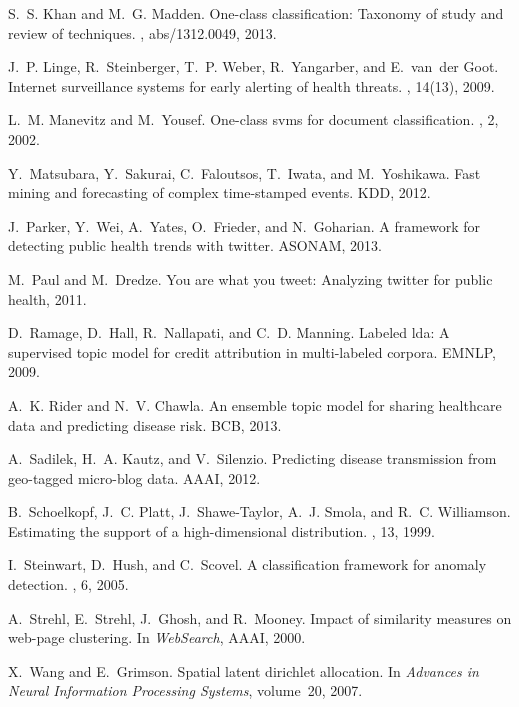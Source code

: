 \documentclass[twoside,leqno,twocolumn]{article}
\begin{document}
\begin{thebibliography}{10}
S.~S. Khan and M.~G. Madden.
\newblock One-class classification: Taxonomy of study and review of techniques.
, abs/1312.0049, 2013.

J.~P. Linge, R.~Steinberger, T.~P. Weber, R.~Yangarber, and E.~van~der Goot.
\newblock Internet surveillance systems for early alerting of health threats.
, 14(13), 2009.

L.~M. Manevitz and M.~Yousef.
\newblock One-class svms for document classification.
, 2, 2002.

Y.~Matsubara, Y.~Sakurai, C.~Faloutsos, T.~Iwata, and M.~Yoshikawa.
\newblock Fast mining and forecasting of complex time-stamped events.
\newblock KDD, 2012.

J.~Parker, Y.~Wei, A.~Yates, O.~Frieder, and N.~Goharian.
\newblock A framework for detecting public health trends with twitter.
\newblock ASONAM, 2013.

M.~Paul and M.~Dredze.
\newblock You are what you tweet: Analyzing twitter for public health, 2011.

D.~Ramage, D.~Hall, R.~Nallapati, and C.~D. Manning.
\newblock Labeled lda: A supervised topic model for credit attribution in
  multi-labeled corpora.
\newblock EMNLP, 2009.

A.~K. Rider and N.~V. Chawla.
\newblock An ensemble topic model for sharing healthcare data and predicting
  disease risk.
\newblock BCB, 2013.

A.~Sadilek, H.~A. Kautz, and V.~Silenzio.
\newblock Predicting disease transmission from geo-tagged micro-blog data.
\newblock AAAI, 2012.

B.~Schoelkopf, J.~C. Platt, J.~Shawe-Taylor, A.~J. Smola, and R.~C. Williamson.
\newblock Estimating the support of a high-dimensional distribution.
, 13, 1999.

I.~Steinwart, D.~Hush, and C.~Scovel.
\newblock A classification framework for anomaly detection.
, 6, 2005.

A.~Strehl, E.~Strehl, J.~Ghosh, and R.~Mooney.
\newblock Impact of similarity measures on web-page clustering.
\newblock In {\em WebSearch}, AAAI, 2000.

X.~Wang and E.~Grimson.
\newblock Spatial latent dirichlet allocation.
\newblock In {\em Advances in Neural Information Processing Systems},
  volume~20, 2007.


\end{thebibliography}
\end{document}
